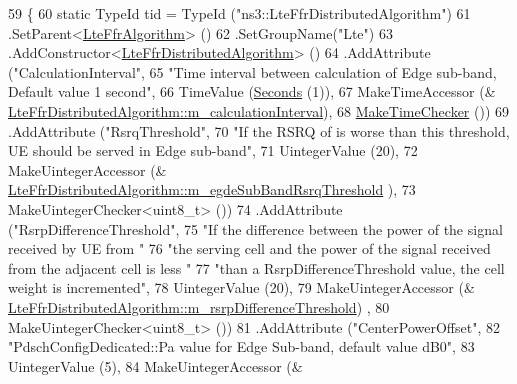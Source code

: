 \begin{DoxyCode}
59 \{
60   \textcolor{keyword}{static} TypeId tid = TypeId (\textcolor{stringliteral}{"ns3::LteFfrDistributedAlgorithm"})
61     .SetParent<\hyperlink{classns3_1_1LteFfrAlgorithm_a1cfb2b0c9339553d90bf3eee7b66b25f}{LteFfrAlgorithm}> ()
62     .SetGroupName(\textcolor{stringliteral}{"Lte"})
63     .AddConstructor<\hyperlink{classns3_1_1LteFfrDistributedAlgorithm_a5fd18eae96198331091bbb7b0391f4fa}{LteFfrDistributedAlgorithm}> ()
64     .AddAttribute (\textcolor{stringliteral}{"CalculationInterval"},
65                    \textcolor{stringliteral}{"Time interval between calculation of Edge sub-band, Default value 1 second"},
66                    TimeValue (\hyperlink{group__timecivil_ga33c34b816f8ff6628e33d5c8e9713b9e}{Seconds} (1)),
67                    MakeTimeAccessor (&
      \hyperlink{classns3_1_1LteFfrDistributedAlgorithm_a404a92a46615776b6fb6c1b761ec1535}{LteFfrDistributedAlgorithm::m\_calculationInterval}),
68                    \hyperlink{group__time_ga7032965bd4afa578691d88c09e4481c1}{MakeTimeChecker} ())
69     .AddAttribute (\textcolor{stringliteral}{"RsrqThreshold"},
70                    \textcolor{stringliteral}{"If the RSRQ of is worse than this threshold, UE should be served in Edge sub-band"},
71                    UintegerValue (20),
72                    MakeUintegerAccessor (&
      \hyperlink{classns3_1_1LteFfrDistributedAlgorithm_ade96e62e63dde620a95c7e6cab54f1b8}{LteFfrDistributedAlgorithm::m\_egdeSubBandRsrqThreshold}
      ),
73                    MakeUintegerChecker<uint8\_t> ())
74     .AddAttribute (\textcolor{stringliteral}{"RsrpDifferenceThreshold"},
75                    \textcolor{stringliteral}{"If the difference between the power of the signal received by UE from "}
76                    \textcolor{stringliteral}{"the serving cell and the power of the signal received from the adjacent cell is less "}
77                    \textcolor{stringliteral}{"than a RsrpDifferenceThreshold value, the cell weight is incremented"},
78                    UintegerValue (20),
79                    MakeUintegerAccessor (&
      \hyperlink{classns3_1_1LteFfrDistributedAlgorithm_a32f38a14793a97940c6467d520ad3279}{LteFfrDistributedAlgorithm::m\_rsrpDifferenceThreshold})
      ,
80                    MakeUintegerChecker<uint8\_t> ())
81     .AddAttribute (\textcolor{stringliteral}{"CenterPowerOffset"},
82                    \textcolor{stringliteral}{"PdschConfigDedicated::Pa value for Edge Sub-band, default value dB0"},
83                    UintegerValue (5),
84                    MakeUintegerAccessor (&

\end{DoxyCode}
